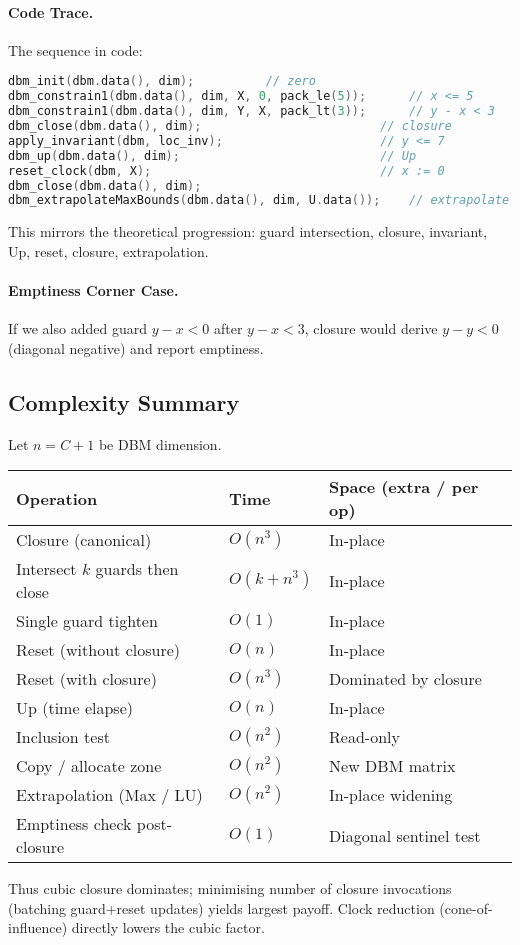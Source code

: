 \paragraph{Code Trace.} The sequence in code:
\begin{lstlisting}[language=C++]
dbm_init(dbm.data(), dim);          // zero
dbm_constrain1(dbm.data(), dim, X, 0, pack_le(5));      // x <= 5
dbm_constrain1(dbm.data(), dim, Y, X, pack_lt(3));      // y - x < 3
dbm_close(dbm.data(), dim);                         // closure
apply_invariant(dbm, loc_inv);                      // y <= 7
dbm_up(dbm.data(), dim);                            // Up
reset_clock(dbm, X);                                // x := 0
dbm_close(dbm.data(), dim);
dbm_extrapolateMaxBounds(dbm.data(), dim, U.data());    // extrapolate
\end{lstlisting}
This mirrors the theoretical progression: guard intersection, closure, invariant, Up, reset, closure, extrapolation.

\paragraph{Emptiness Corner Case.} If we also added guard $y - x < 0$ after $y - x < 3$, closure would derive $y - y < 0$ (diagonal negative) and report emptiness.

\subsection{Complexity Summary}
Let $n = C+1$ be DBM dimension.
\begin{center}
\begin{tabular}{l|l|l}
Operation & Time & Space (extra / per op) \\\hline
Closure (canonical) & $O(n^3)$ & In-place \\
Intersect $k$ guards then close & $O(k + n^3)$ & In-place \\
Single guard tighten & $O(1)$ & In-place \\
Reset (without closure) & $O(n)$ & In-place \\
Reset (with closure) & $O(n^3)$ & Dominated by closure \\
Up (time elapse) & $O(n)$ & In-place \\
Inclusion test & $O(n^2)$ & Read-only \\
Copy / allocate zone & $O(n^2)$ & New DBM matrix \\
Extrapolation (Max / LU) & $O(n^2)$ & In-place widening \\
Emptiness check post-closure & $O(1)$ & Diagonal sentinel test \\
\end{tabular}
\end{center}
Thus cubic closure dominates; minimising number of closure invocations (batching guard+reset updates) yields largest payoff. Clock reduction (cone-of-influence) directly lowers the cubic factor.
